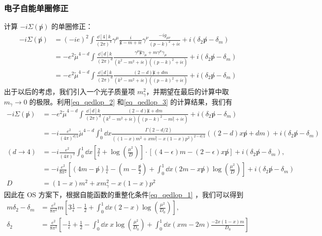 \subsubsection{电子自能单圈修正}
计算 $-i\Sigma(\not p)$ 的单圈修正：
\begin{equation}
\begin{aligned}
-i\Sigma(\not p)
&=(-ie)^2 \int\frac{\dd[4]{k}}{(2\pi)^4} \gamma^\mu\frac{i}{\not k-m+i\epsilon} \gamma^\nu  \frac{-ig_{\mu\nu}}{(p-k)^2+i\epsilon}+i(\delta_2\not p -\delta_m)\\
&=-e^2\tilde{\mu}^{4-d} \int\frac{\dd[d]{k}}{(2\pi)^d} \frac{\gamma^\mu \not k \gamma_\mu + m\gamma^\mu\gamma_\mu}{(k^2-m^2+i\epsilon)((p-k)^2+i\epsilon)}+i(\delta_2\not p -\delta_m)
\\
&=-e^2\tilde{\mu}^{4-d} \int\frac{\dd[d]{k}}{(2\pi)^d} \frac{(2-d)\not k + dm}{(k^2-m^2+i\epsilon)((p-k)^2+i\epsilon)}+i(\delta_2\not p -\delta_m)
\end{aligned}
\end{equation}
出于以后的考虑，我们引入一个光子质量项 $m_\gamma^2$，并期望在最后的计算中取 $m_\gamma\rightarrow 0$ 的极限。利用\autoref{eq_qedlop_2} 和\autoref{eq_qedlop_3} 的计算结果，我们有
\begin{equation}
\begin{aligned}
-i\Sigma(\not p)
&=-e^2\tilde{\mu}^{4-d} \int\frac{\dd[d]{k}}{(2\pi)^d} \frac{(2-d)\not k + dm}{(k^2-m^2+i\epsilon)((p-k)^2-m_\gamma^2+i\epsilon)}+i(\delta_2\not p -\delta_m)
\\
&= -i\frac{e^2}{(4\pi)^{d/2}}\tilde{\mu}^{4-d}
\int_0^1 \dd x \frac{\Gamma(2-d/2)}{((1-x)m^2+x m_\gamma^2-x(1-x)p^2)^{2-d/2}}((2-d)x\not p+dm)
+i(\delta_2\not p -\delta_m)
\\
(d\rightarrow 4)&= -i\frac{e^2}{(4\pi)^2}  \int_0^1 \dd x \left[\frac{2}{\epsilon}+\log\left(\frac{\mu^2}{D}\right)\right]\cdot \left[(4-\epsilon)m -(2-\epsilon)x\not p\right]
+i(\delta_2\not p -\delta_m),\\
&=-i\frac{e^2}{8\pi^2}\left[(4m-\not p)\frac{1}{\epsilon}-\left(m-\frac{\not p}{2}\right)+ \int_0^1\dd x (2m-x\not p)\log\left(\frac{\mu^2}{D}\right) \right]
+i(\delta_2\not p -\delta_m)\\
D&=(1-x)m^2+xm_\gamma^2-x(1-x)p^2
\end{aligned}
\end{equation}
因此在 OS 方案下，根据自能函数的重整化条件\autoref{eq_qedlop_1} ，我们可以得到
\begin{equation}
\begin{aligned}
m\delta_2 - \delta_m &= \frac{e^2}{8\pi^2}m\left[3\frac{1}{\epsilon}-\frac{1}{2}+ \int_0^1\dd{x} (2-x)\log\left(\frac{\mu^2}{D_0}\right) \right],\\
\delta_2 &= \frac{e^2}{8\pi^2}\left[-\frac{1}{\epsilon}+\frac{1}{2}-\int_0^1 \dd{x}\ x\log\left(\frac{\mu^2}{D_0} \right) 
+\int_0^1 \dd{x} (xm-2m)\frac{-2x(1-x)m}{D_0}
\right]
\end{aligned}
\end{equation}
